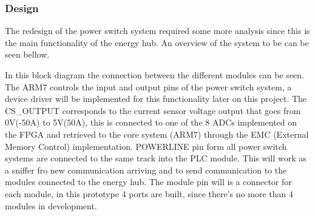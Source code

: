 \subsubsection{Design}
%
%
%
The redesign of the power switch system required some more analysis since this is the main functionality of the energy hub. 
An overview of the system to be can be seen bellow.

\begin{figure}[H]
	\begin{centering}
	\end{centering}
\end{figure}

In this block diagram the connection between the different modules can be seen. The ARM7 controls the input and output pins of the power switch system, a device driver will be implemented for this functionality later on this project. 
The CS_OUTPUT corresponds to the current sensor voltage output that goes from 0V(-50A) to 5V(50A), this is connected to one of the 8 ADCs implemented on the FPGA and retrieved to the core system (ARM7) through the EMC (External Memory Control) implementation.
POWERLINE pin form all power switch systems are connected to the same track into the PLC module. This will work as a sniffer fro new communication arriving and to send communication to the modules connected to the energy hub.
The module pin will is a connector for each module, in this prototype 4 ports are built, since there's no more than 4 modules in development.



